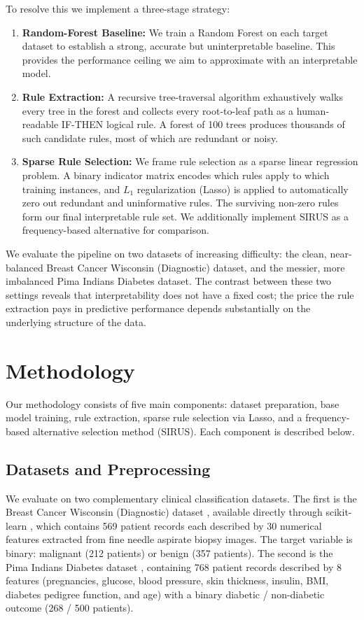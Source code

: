 \documentclass[11pt]{article}
\begin{document}
To resolve this we implement a three-stage strategy:

\begin{enumerate}
\item \textbf{Random-Forest Baseline:} We train a Random Forest on each target dataset to establish a strong, accurate but uninterpretable baseline. This provides the performance ceiling we aim to approximate with an interpretable model.
\item \textbf{Rule Extraction:} A recursive tree-traversal algorithm exhaustively walks every tree in the forest and collects every root-to-leaf path as a human-readable IF-THEN logical rule. A forest of 100 trees produces thousands of such candidate rules, most of which are redundant or noisy.
\item \textbf{Sparse Rule Selection:} We frame rule selection as a sparse linear regression problem. A binary indicator matrix encodes which rules apply to which training instances, and $L_1$ regularization (Lasso) is applied to automatically zero out redundant and uninformative rules. The surviving non-zero rules form our final interpretable rule set. We additionally implement SIRUS \citep{benard2021sirus} as a frequency-based alternative for comparison.
\end{enumerate}

We evaluate the pipeline on two datasets of increasing difficulty: the clean, near-balanced Breast Cancer Wisconsin (Diagnostic) dataset, and the messier, more imbalanced Pima Indians Diabetes dataset. The contrast between these two settings reveals that interpretability does not have a fixed cost; the price the rule extraction pays in predictive performance depends substantially on the underlying structure of the data.

\section{Methodology}

Our methodology consists of five main components: dataset preparation, base model training, rule extraction, sparse rule selection via Lasso, and a frequency-based alternative selection method (SIRUS). Each component is described below.

\subsection{Datasets and Preprocessing}

We evaluate on two complementary clinical classification datasets. The first is the Breast Cancer Wisconsin (Diagnostic) dataset \citep{wolberg1995breastcancer}, available directly through scikit-learn \citep{pedregosa2011sklearn}, which contains 569 patient records each described by 30 numerical features extracted from fine needle aspirate biopsy images. The target variable is binary: malignant (212 patients) or benign (357 patients). The second is the Pima Indians Diabetes dataset \citep{smith1988pima}, containing 768 patient records described by 8 features (pregnancies, glucose, blood pressure, skin thickness, insulin, BMI, diabetes pedigree function, and age) with a binary diabetic / non-diabetic outcome (268 / 500 patients).
\end{document}
